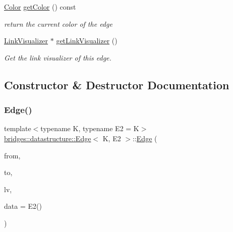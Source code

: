 \begin{DoxyCompactItemize}
\hyperlink{classbridges_1_1datastructure_1_1_color}{Color} \hyperlink{classbridges_1_1datastructure_1_1_edge_abb5c66b734e1ac71e5d4e012908ec7a4}{get\+Color} () const
\begin{DoxyCompactList}\small\item\em return the current color of the edge \end{DoxyCompactList}\item 
\hyperlink{classbridges_1_1datastructure_1_1_link_visualizer}{Link\+Visualizer} $\ast$ \hyperlink{classbridges_1_1datastructure_1_1_edge_a0470604705c93dd33b382a70d5c78f93}{get\+Link\+Visualizer} ()
\begin{DoxyCompactList}\small\item\em Get the link visualizer of this edge. \end{DoxyCompactList}\end{DoxyCompactItemize}


\subsection{Constructor \& Destructor Documentation}
\mbox{\label{classbridges_1_1datastructure_1_1_edge_aae44cef647b20d260b449a5fb041ae95}} 
\subsubsection{\texorpdfstring{Edge()}{Edge()}}
{\footnotesize\ttfamily template$<$typename K, typename E2 = K$>$ \\
\hyperlink{classbridges_1_1datastructure_1_1_edge}{bridges\+::datastructure\+::\+Edge}$<$ K, E2 $>$\+::\hyperlink{classbridges_1_1datastructure_1_1_edge}{Edge} (\begin{DoxyParamCaption}\item[{const K \&}]{from,  }\item[{const K \&}]{to,  }\item[{\hyperlink{classbridges_1_1datastructure_1_1_link_visualizer}{Link\+Visualizer} $\ast$}]{lv,  }\item[{const E2 \&}]{data = {\ttfamily E2()} }\end{DoxyParamCaption})\hspace{0.3cm}{\ttfamily [inline]}}



